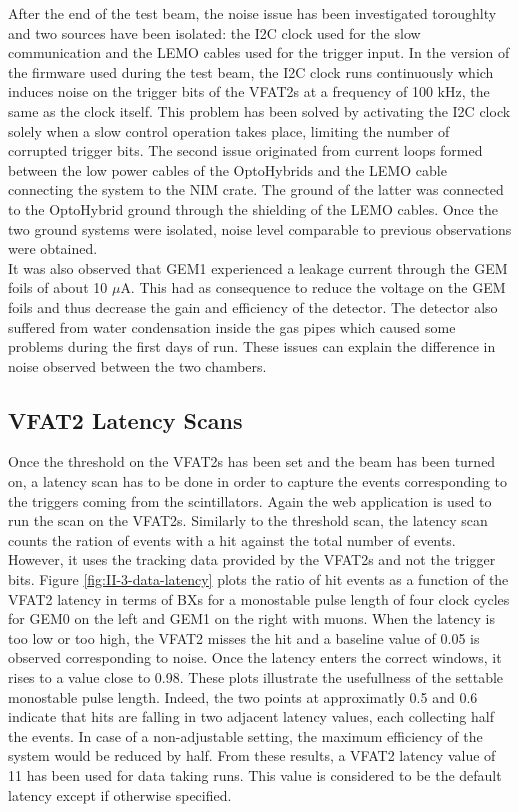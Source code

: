      After the end of the test beam, the noise issue has been investigated toroughlty and two sources have been isolated: the I2C clock used for the slow communication and the LEMO cables used for the trigger input. In the version of the firmware used during the test beam, the I2C clock runs continuously which induces noise on the trigger bits of the VFAT2s at a frequency of 100 kHz, the same as the clock itself. This problem has been solved by activating the I2C clock solely when a slow control operation takes place, limiting the number of corrupted trigger bits. The second issue originated from current loops formed between the low power cables of the OptoHybrids and the LEMO cable connecting the system to the NIM crate. The ground of the latter was connected to the OptoHybrid ground through the shielding of the LEMO cables. Once the two ground systems were isolated, noise level comparable to previous observations were obtained. \\

      It was also observed that GEM1 experienced a leakage current through the GEM foils of about 10 $\mu$A. This had as consequence to reduce the voltage on the GEM foils and thus decrease the gain and efficiency of the detector. The detector also suffered from water condensation inside the gas pipes which caused some problems during the first days of run. These issues can explain the difference in noise observed between the two chambers.

    \subsection{VFAT2 Latency Scans}

      Once the threshold on the VFAT2s has been set and the beam has been turned on, a latency scan has to be done in order to capture the events corresponding to the triggers coming from the scintillators. Again the web application is used to run the scan on the VFAT2s. Similarly to the threshold scan, the latency scan counts the ration of events with a hit against the total number of events. However, it uses the tracking data provided by the VFAT2s and not the trigger bits. Figure \ref{fig:II-3-data-latency} plots the ratio of hit events as a function of the VFAT2 latency in terms of BXs for a monostable pulse length of four clock cycles for GEM0 on the left and GEM1 on the right with muons. When the latency is too low or too high, the VFAT2 misses the hit and a baseline value of 0.05 is observed corresponding to noise. Once the latency enters the correct windows, it rises to a value close to 0.98. These plots illustrate the usefullness of the settable monostable pulse length. Indeed, the two points at approximatly 0.5 and 0.6 indicate that hits are falling in two adjacent latency values, each collecting half the events. In case of a non-adjustable setting, the maximum efficiency of the system would be reduced by half. From these results, a VFAT2 latency value of 11 has been used for data taking runs. This value is considered to be the default latency except if otherwise specified. \\

